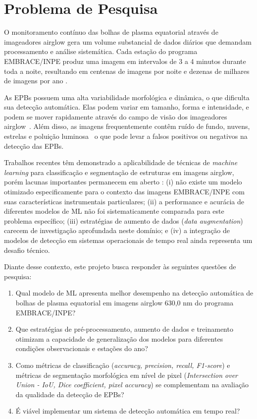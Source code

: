 \chapter{Problema de Pesquisa}

O monitoramento contínuo das bolhas de plasma equatorial através de imageadores airglow gera um volume substancial de dados diários que demandam processamento e análise sistemática. Cada estação do programa EMBRACE/INPE produz uma imagem em intervalos de 3 a 4 minutos durante toda a noite, resultando em centenas de imagens por noite e dezenas de milhares de imagens por ano \cite{Githio2024}.

As EPBs possuem uma alta variabilidade morfológica e dinâmica, o que dificulta sua detecção automática. Elas podem variar em tamanho, forma e intensidade, e podem se mover rapidamente através do campo de visão dos imageadores airglow~\cite{Githio2024}. Além disso, as imagens frequentemente contêm ruído de fundo, nuvens, estrelas e poluição luminosa~\cite{Siddiqui2025} o que pode levar a falsos positivos ou negativos na detecção das EPBs.

Trabalhos recentes têm demonstrado a aplicabilidade de técnicas de \textit{machine learning} para classificação e segmentação de estruturas em imagens airglow, porém lacunas importantes permanecem em aberto \cite{Githio2024}: (i) não existe um modelo otimizado especificamente para o contexto das imagens EMBRACE/INPE com suas características instrumentais particulares; (ii) a performance e acurácia de diferentes modelos de ML não foi sistematicamente comparada para este problema específico; (iii) estratégias de aumento de dados (\textit{data augmentation}) carecem de investigação aprofundada neste domínio; e (iv) a integração de modelos de detecção em sistemas operacionais de tempo real ainda representa um desafio técnico.

Diante desse contexto, este projeto busca responder às seguintes questões de pesquisa:

\begin{enumerate}
\item Qual modelo de ML apresenta melhor desempenho na detecção automática de bolhas de plasma equatorial em imagens airglow 630,0 nm do programa EMBRACE/INPE?
\item Que estratégias de pré-processamento, aumento de dados e treinamento otimizam a capacidade de generalização dos modelos para diferentes condições observacionais e estações do ano?
\item Como métricas de classificação (\textit{accuracy, precision, recall, F1-score}) e métricas de segmentação morfológica em nível de pixel (\textit{Intersection over Union - IoU, Dice coefficient, pixel accuracy}) se complementam na avaliação da qualidade da detecção de EPBs?
\item É viável implementar um sistema de detecção automática em tempo real?
\end{enumerate}